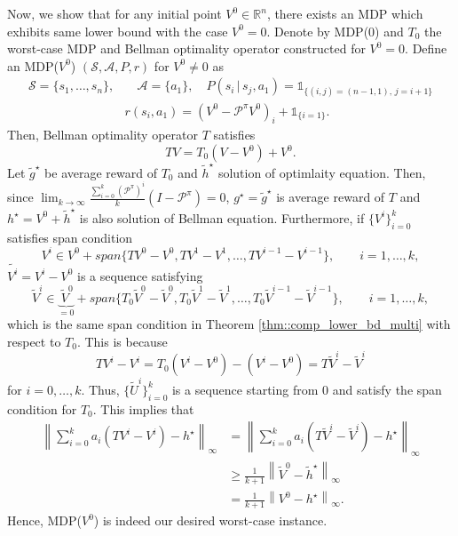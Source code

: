 \documentclass{article} %
\newcommand{\cA}{\mathcal{A}}
\newcommand{\cS}{\mathcal{S}}
\newcommand{\cP}{\mathcal{P}}
\newcommand{\real}{\mathbb{R}}
\newcommand*{\para}[1]{\left({#1}\right)}
\newcommand*{\infn}[1]{\left\|{#1}\right\|_{\infty}}
\begin{document}
Now, we show that for any initial point $V^0 \in \real^n$, there exists an MDP which exhibits same lower bound with the case $V^0=0$. Denote by MDP($0$) and $T_0$ the worst-case MDP and Bellman optimality operator constructed for $V^0=0$. Define an MDP($V^0$) $(\cS, \cA, P, r)$ for $V^0\neq 0$ as
\begin{align*}
        \cS=\{s_1,\dots, s_{n}\}, &\quad \cA=\{a_1\},  \quad P(s_i\,|\,s_j,a_1)=\mathds{1}_{\{(i,j)=(n-1,1), \,j=i+1 \}}
        \\& r(s_i, a_1)=\para{V^0-\cP^{\pi}V^0}_i+\mathds{1}_{\{i=1\}}.
\end{align*}
Then, Bellman optimality operator $T$ satisfies 
\[TV=T_0(V-V^0)+V^0.\]
Let $\tilde{g}^{\star}$ be average reward of $T_0$ and $\tilde{h}^{\star}$ solution of optimlaity equation. Then, since $\lim_{k \rightarrow \infty}\frac{\sum^k_{i=0}\para{\cP^{\pi}}^i}{k}(I-\cP^{\pi})=0$, $g^{\star}=\tilde{g}^{\star}$ is average reward of $T$ and $h^{\star}=V^0+\tilde{h}^{\star}$ is also solution of Bellman equation.
Furthermore, if $\{V^i\}^k_{i=0}$ satisfies span condition 
\[V^i \in V^0+span\{TV^0-V^0, TV^1-V^1, \dots, TV^{i-1}-V^{i-1} \}, \qquad i=1,\dots, k, \]
$\tilde{V^i}=V^i-V^0$ is a sequence satisfying 
\[\tilde{V}^i \in \underbrace{\,\tilde{V}^0}_{=0}+span\{T_0\tilde{V}^0-\tilde{V}^0, T_0\tilde{V}^1-\tilde{V}^1, \dots, T_0\tilde{V}^{i-1}-\tilde{V}^{i-1} \}, \qquad i=1,\dots, k, \]
which is the same span condition in Theorem \ref{thm::comp_lower_bd_multi} with respect to $T_0$. This is because
\[TV^i-V^i=T_0(V^i-V^0)-(V^i-V^0)=T\tilde{V}^i-\tilde{V}^i\]
for $i=0,\dots,k$.
Thus, $\{\tilde{U}^i\}^k_{i=0}$
is a sequence starting from $0$ and satisfy the span condition for $T_0$. This implies that
\begin{align*}
    \infn{\sum^{k}_{i=0} a_i (TV^i-V^i)-h^{\star}} &=  \infn{\sum^{k}_{i=0} a_i (T\tilde{V}^i-\tilde{V}^i)-h^{\star}} \\&\ge \frac{1}{k+1}\infn{\tilde{V}^0-\tilde{h}^{\star}}\\&= \frac{1}{k+1}\infn{V^0-h^{\star}}. 
\end{align*} 
Hence, MDP($V^0$) is indeed our desired worst-case instance.
\end{document}
